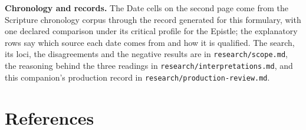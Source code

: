 {\textbf{Chronology and records.} The Date cells on the second page come from
the Scripture chronology corpus through the record generated for this
formulary, with one declared comparison under its critical profile for the
Epistle; the explanatory rows say which source each date comes from and how it
is qualified. The search, its loci, the disagreements and the negative results
are in \texttt{research/scope.md}, the reasoning behind the three readings in
\texttt{research/interpretations.md}, and this companion's production record in
\texttt{research/production-review.md}.
\par}

\section*{References}

